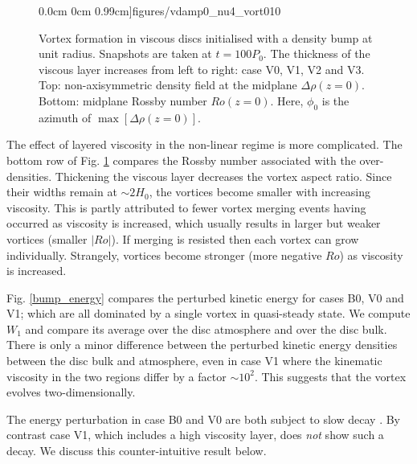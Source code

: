 \begin{figure}
     0.0cm 0cm
     0.99cm]{figures/vdamp0_nu4_vort010}
   \caption{Vortex formation in viscous discs initialised with
     a density bump at unit radius. Snapshots are taken at $t=100P_0$. The
     thickness of the viscous layer increases from left to 
     right: case V0, V1, V2 and V3.   
     Top: non-axisymmetric density field at the midplane
     $\Delta\rho(z=0)$. Bottom: midplane Rossby number
     $Ro(z=0)$. Here, $\phi_0$ is the azimuth of $\max[\Delta\rho(z=0)]$. 
     \label{vdamp0}
   }
\end{figure}


The effect of layered viscosity in the non-linear regime is more
complicated. The bottom row of Fig. \ref{vdamp0} compares the Rossby number
associated with the over-densities. Thickening the viscous 
layer decreases the vortex aspect ratio. Since their widths remain
at $\sim 2H_0$, the vortices become smaller with increasing
viscosity. This is partly attributed to fewer vortex merging
events having occurred as viscosity is increased, which 
usually results in larger but weaker vortices (smaller
$|Ro|$). If merging is resisted then each vortex can grow individually.  
Strangely, vortices become stronger  (more negative $Ro$) as viscosity
is increased. 

Fig. \ref{bump_energy} compares the perturbed kinetic energy for 
cases B0, V0 and V1; which are all dominated by a single vortex in 
quasi-steady state. We compute $W_1$ and compare its
average over the disc atmosphere and over the 
disc bulk. There is only a minor difference between the
perturbed kinetic energy densities between the disc bulk and
atmosphere, even in case V1 where the kinematic viscosity in the two
regions differ by a factor $\sim10^2$. This suggests that the
vortex evolves two-dimensionally. 

The energy perturbation in case B0 and V0 are both subject to
slow decay \citep[a result also observed by][]{meheut12}.  
By contrast case V1, which includes a high viscosity layer, does
\emph{not} show such a decay. We discuss this counter-intuitive result
below.  


